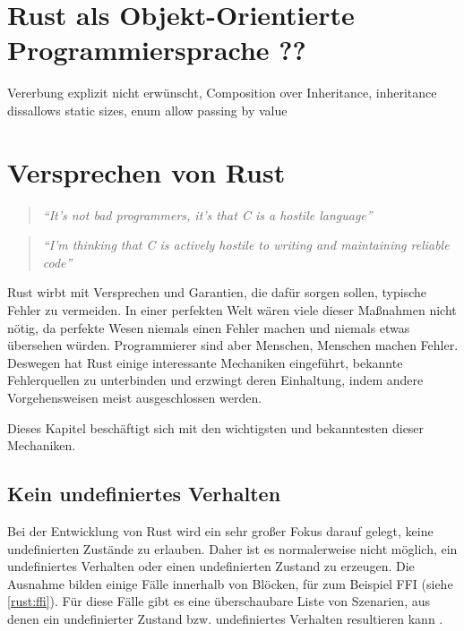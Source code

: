 \section{ Rust als Objekt-Orientierte Programmiersprache ??}
\label{rust:oop}

Vererbung explizit nicht erwünscht, Composition over Inheritance, inheritance dissallows static sizes, enum allow passing by value




\section{Versprechen von Rust}
\label{rust:guarantees}

\begin{quotation}
	\textit{\enquote{It’s not bad programmers, it’s that C is a hostile language}} 
	\cite[54]{rust:c_is_hostile_mena}
\end{quotation}

\begin{quotation}
	\textit{\enquote{I’m thinking that C is actively hostile to writing and maintaining reliable code}} 
	\cite[129]{rust:c_is_hostile_mena}
\end{quotation}

Rust wirbt mit Versprechen und Garantien, die dafür sorgen sollen, typische Fehler zu vermeiden.
In einer perfekten Welt wären viele dieser Maßnahmen nicht nötig, da perfekte Wesen niemals einen Fehler machen und niemals etwas übersehen würden.
Programmierer sind aber Menschen, Menschen machen Fehler.
Deswegen hat Rust einige interessante Mechaniken eingeführt, bekannte Fehlerquellen zu unterbinden und erzwingt deren Einhaltung, indem andere Vorgehensweisen meist ausgeschlossen werden.

Dieses Kapitel beschäftigt sich mit den wichtigsten und bekanntesten dieser Mechaniken.

\subsection{Kein undefiniertes Verhalten}
\label{rust:no_unitialized_usage}
\label{rust:no_undefined}

Bei der Entwicklung von Rust wird ein sehr großer Fokus darauf gelegt, keine undefinierten Zustände zu erlauben.
Daher ist es normalerweise nicht möglich, ein undefiniertes Verhalten oder einen undefinierten Zustand zu erzeugen.
Die Ausnahme bilden einige Fälle innerhalb von  Blöcken, für zum Beispiel FFI (siehe \autoref{rust:ffi}).
Für diese Fälle gibt es eine überschaubare Liste von Szenarien, aus denen ein undefinierter Zustand bzw. undefiniertes Verhalten resultieren kann \cite{rust:book:undefined}.

